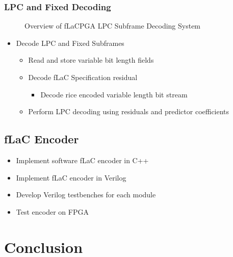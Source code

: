 \documentclass[12pt]{scrartcl}
\begin{document}
  \subsubsection{LPC and Fixed Decoding}
  \begin{figure}[H]
    \caption{Overview of fLaCPGA LPC Subframe Decoding System}
    \label{fig:LPC_overview}
  \end{figure}
  \begin{itemize}
  \item Decode LPC and Fixed Subframes
    \begin{itemize}
    \item Read and store variable bit length fields
    \item Decode fLaC Specification residual
      \begin{itemize}
      \item Decode rice encoded variable length bit stream
      \end{itemize}
    \item Perform LPC decoding using residuals and predictor coefficients
    \end {itemize}
  \end{itemize}
  
  \subsection{fLaC Encoder}
  \begin{itemize}
  \item Implement software fLaC encoder in C++
  \item Implement fLaC encoder in Verilog
  \item Develop Verilog testbenches for each module
  \item Test encoder on FPGA
  \end{itemize}
  
  \section{Conclusion}

  
  
\end{document}
